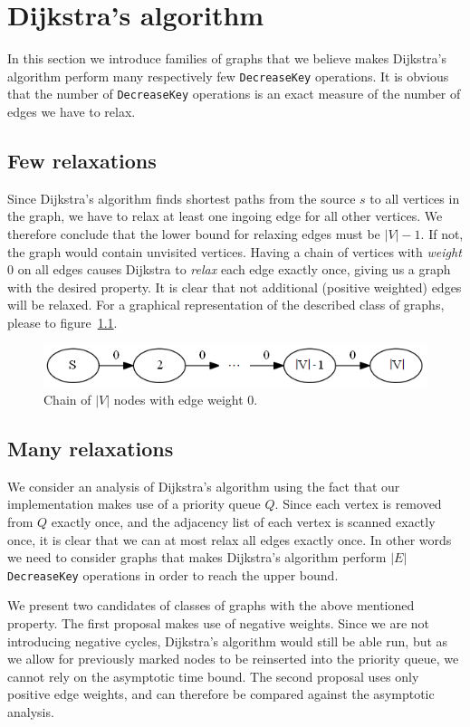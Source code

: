 \documentclass[a4paper,oneside,article,11pt]{memoir}
\begin{document}
\chapter{Dijkstra's algorithm}
In this section we introduce families of graphs that we believe makes Dijkstra's algorithm perform many respectively few \texttt{DecreaseKey} operations. It is obvious that the number of \texttt{DecreaseKey} operations is an exact measure of the number of edges we have to relax.

\section{Few relaxations}
Since Dijkstra's algorithm finds shortest paths from the source $s$ to all vertices in the graph, we have to relax at least one ingoing edge for all other vertices. We therefore conclude that the lower bound for relaxing edges must be $\vert V \vert -1$. If not, the graph would contain unvisited vertices. Having a chain of vertices with \textit{weight} 0 on all edges causes Dijkstra to \textit{relax} each edge exactly once, giving us a graph with the desired property. It is clear that not additional (positive weighted) edges will be relaxed. For a graphical representation of the described class of graphs, please to figure~\ref{figure:graph_chain}.

\begin{figure}
\centering
\includegraphics[scale=1]{../figures/graph_chain.png}
\caption{Chain of $\vert V \vert$ nodes with edge weight 0.}
\label{figure:graph_chain}
\end{figure}

\section{Many relaxations}
We consider an analysis of Dijkstra's algorithm using the fact that our implementation makes use of a priority queue $Q$. Since each vertex is removed from $Q$ exactly once, and the adjacency list of each vertex is scanned exactly once, it is clear that we can at most relax all edges exactly once.
In other words we need to consider graphs that makes Dijkstra's algorithm perform $\vert E \vert$ \texttt{DecreaseKey} operations in order to reach the upper bound.

We present two candidates of classes of graphs with the above mentioned property. The first proposal makes use of negative weights. Since we are not introducing negative cycles, Dijkstra's algorithm would still be able run, but as we allow for previously marked nodes to be reinserted into the priority queue, we cannot rely on the asymptotic time bound. The second proposal uses only positive edge weights, and can therefore be compared against the asymptotic analysis.
\end{document}
